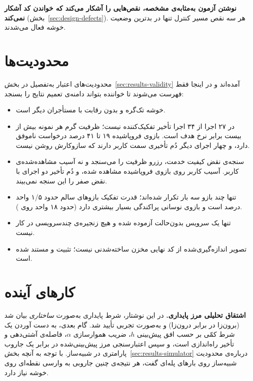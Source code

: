 \textbf{نوشتن آزمون به‌مثابه‌ی مشخصه، نقص‌هایی را آشکار می‌کند که خواندن کد آشکار نمی‌کند}
(بخش~\ref{sec:design-defects}). هر سه نقص مسیر کنترل تنها در بدترین وضعیت خوشه فعال می‌شدند.

\section{محدودیت‌ها}
\label{sec:conclusion-limitations}

محدودیت‌های اعتبار به‌تفصیل در بخش~\ref{sec:results-validity} آمده‌اند و در اینجا فقط فهرست
می‌شوند تا خواننده بتواند دامنه‌ی تعمیم نتایج را بسنجد:

\begin{itemize}
  \item خوشه تک‌گره و بدون رقابت با مستأجران دیگر است.
  \item در ۲۷ اجرا از ۳۴ اجرا تأخیر تفکیک‌کننده نیست؛ ظرفیت گرم هر نمونه بیش از بیست برابر نرخ
  هدف است. بازوی فروپاشیده ۱۹ تا ۴۱ درصد درخواست ناموفق دارد، و چهار اجرای دیگر دُم تأخیری
  سمت کاربر دارند که سازوکارش روشن نیست.
  \item سنجه‌ی نقض کیفیت خدمت، رزرو ظرفیت را می‌سنجد و نه آسیب مشاهده‌شده‌ی کاربر. آسیب کاربر
  روی بازوی فروپاشیده مشاهده شده، و دُم تأخیر دو اجرای  با نقض صفر را این سنجه
  نمی‌بیند.
  \item تنها چند بازو سه بار تکرار شده‌اند؛ قدرت تفکیک بازوهای سالم حدود ۱/۵ واحد درصد است و
  بازوی نوسانی پراکندگی بسیار بیشتری دارد (حدود ۱۸ واحد روی ).
  \item تنها یک سرویس بدون‌حالت آزموده شده و هیچ زنجیره‌ی چندسرویسی در کار نیست.
  \item تصویر اندازه‌گیری‌شده از کد نهایی مخزن ساخته‌شدنی نیست؛ تثبیت و مستند شده است.
\end{itemize}

\section{کارهای آینده}
\label{sec:conclusion-future}

\textbf{اشتقاق تحلیلی مرز پایداری.} در این نوشتار، شرط پایداری به‌صورت \emph{ساختاری} بیان شد
(برون‌زا در برابر درون‌زا) و به‌صورت تجربی تأیید شد. گام بعدی، به دست آوردن یک شرط کمّی بر
حسب افق پیش‌بینی $h$، ضریب هموارسازی $\alpha$، فاصله‌ی آشتی‌دهی و تأخیر راه‌اندازی است، و
سپس اعتبارسنجی مرز پیش‌بینی‌شده در برابر یک جاروب پارامتری در شبیه‌ساز. با توجه به آنچه
بخش~\ref{sec:results-simulator} درباره‌ی محدودیت شبیه‌ساز روی بارهای پله‌ای گفت، هر نتیجه‌ی
چنین جاروبی به وارسی نقطه‌ای روی خوشه نیاز دارد.

